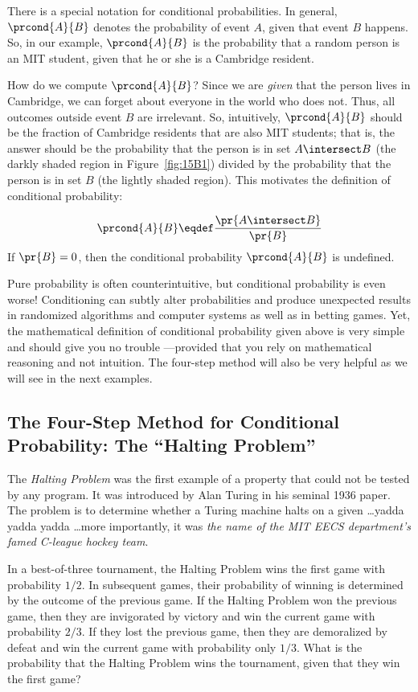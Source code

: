 There is a special notation for conditional probabilities.  In
general, $\prcond{A}{B}$ denotes the probability of event $A$, given
that event $B$ happens.  So, in our example, $\prcond{A}{B}$ is the
probability that a random person is an MIT student, given that he or
she is a Cambridge resident.

How do we compute $\prcond{A}{B}$?  Since we are \emph{given} that the
person lives in Cambridge, we can forget about everyone in the world
who does not.  Thus, all outcomes outside event $B$ are irrelevant.
So, intuitively, $\prcond{A}{B}$ should be the fraction of Cambridge
residents that are also MIT students; that is, the answer should be
the probability that the person is in set $A \intersect B$ (the darkly
shaded region in Figure~\ref{fig:15B1}) divided by the probability
that the person is in set $B$ (the lightly shaded region).  This
motivates the definition of conditional probability:
\begin{definition}\label{LN12:prcond}
\[
\prcond{A}{B} \eqdef \frac{\pr{A \intersect B}}{\pr{B}}
\]
If $\pr{B} = 0$, then the conditional probability $\prcond{A}{B}$ is
undefined.
\end{definition}

Pure probability is often counterintuitive, but conditional
probability is even worse!  Conditioning can subtly alter
probabilities and produce unexpected results in randomized algorithms
and computer systems as well as in betting games.  Yet, the
mathematical definition of conditional probability given above is very
simple and should give you no trouble ---provided that you rely on
mathematical reasoning and not intuition.  The four-step method will
also be very helpful as we will see in the next examples.

\subsection{The Four-Step Method for Conditional
  Probability: The ``Halting Problem''}

The \emph{Halting Problem} was the first example of a property that
could not be tested by any program.  It was introduced by Alan Turing
in his seminal 1936 paper.  The problem is to determine whether a
Turing machine halts on a given \dots yadda yadda yadda \dots more
importantly, it was \emph{the name of the MIT EECS department's famed
  C-league hockey team}.

In a best-of-three tournament, the Halting Problem wins the first game
with probability $1/2$.  In subsequent games, their
probability of winning is determined by the outcome of the previous
game.  If the Halting Problem won the previous game, then they are
invigorated by victory and win the current game with probability
$2/3$.  If they lost the previous game, then they are
demoralized by defeat and win the current game with probability only
$1/3$.  What is the probability that the Halting Problem wins
the tournament, given that they win the first game?

